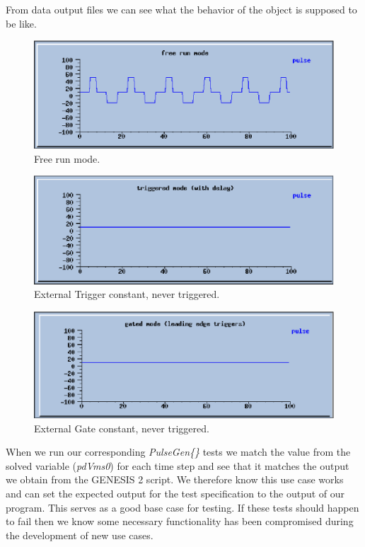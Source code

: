 \documentclass[12pt]{article}
\begin{document}
From data output files we can see what the behavior of the object is supposed to be like.

\begin{figure}[ht]
  \centering
    \includegraphics[scale=0.6]{figures/pulse0.eps}
  \caption{Free run mode.}
\end{figure}

\begin{figure}[ht]
  \centering
    \includegraphics[scale=0.6]{figures/pulse1.eps}
  \caption{External Trigger constant, never triggered.}
\end{figure}

\begin{figure}[ht]
  \centering
    \includegraphics[scale=0.6]{figures/pulse2.eps}
  \caption{External Gate constant, never triggered.}
\end{figure}

When we run our corresponding {\it PulseGen\{\}} tests we match the value from the solved variable ({\it pdVms0}) for each time step and see that it matches the output we obtain from the GENESIS 2 script. We therefore know this use case works and can set the expected output for the test specification to the output of our program. This serves as a good base case for testing. If these tests should happen to fail then we know some necessary functionality has been compromised during the development of new use cases.
\end{document}
